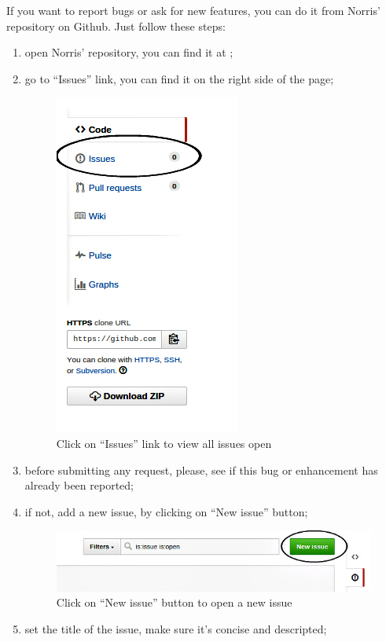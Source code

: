 If you want to report bugs or ask for new features, you can do it from Norris' repository on Github. Just follow these steps:
\begin{enumerate}
	\item open Norris' repository, you can find it at \insuri{};
	\item go to “Issues” link, you can find it on the right side of the page;
	\begin{figure}[H]
		\centering
		\includegraphics[scale=0.6]{Pics/Issues.jpg}
		\caption{Click on “Issues” link to view all issues open}
	\end{figure}
	\item before submitting any request, please, see if this bug or enhancement has already been reported;
	\item if not, add a new issue, by clicking on “New issue” button;
	\begin{figure}[H]
		\centering
		\includegraphics[scale=0.6]{Pics/NewIssue.jpg}
		\caption{Click on “New issue” button to open a new issue}
	\end{figure}
	\item set the title of the issue, make sure it's concise and descripted;

\end{enumerate}
